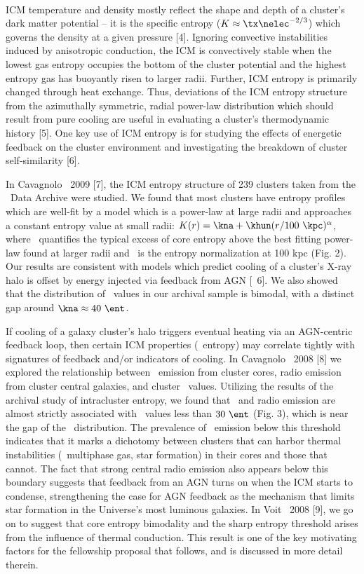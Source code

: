 \documentclass[letterpaper,12pt]{article}
\begin{document}
\\ \indent ICM
temperature and density mostly reflect the shape and depth of a
cluster's dark matter potential -- it is the specific entropy ($K
\approx \tx \nelec^{-2/3}$) which governs the density at a given
pressure [4]. Ignoring convective instabilities induced by anisotropic
conduction, the ICM is convectively stable when the lowest gas entropy
occupies the bottom of the cluster potential and the highest entropy
gas has buoyantly risen to larger radii. Further, ICM entropy is
primarily changed through heat exchange. Thus, deviations of the ICM
entropy structure from the azimuthally symmetric, radial power-law
distribution which should result from pure cooling are useful in
evaluating a cluster's thermodynamic history [5]. One key use of ICM
entropy is for studying the effects of energetic feedback on the
cluster environment and investigating the breakdown of cluster
self-similarity [6].

In Cavagnolo \etal\ 2009 [7], the ICM entropy structure of 239
clusters taken from the \chandra\ Data Archive were studied. We found
that most clusters have entropy profiles which are well-fit by a model
which is a power-law at large radii and approaches a constant entropy
value at small radii: $K(r) = \kna + \khun (r/100 ~\kpc)^{\alpha}$,
where \kna\ quantifies the typical excess of core entropy above the
best fitting power-law found at larger radii and \khun\ is the entropy
normalization at 100 kpc (Fig. 2). Our results are consistent with
models which predict cooling of a cluster's X-ray halo is offset by
energy injected via feedback from AGN [\eg\ 6]. We also showed that
the distribution of \kna\ values in our archival sample is bimodal,
with a distinct gap around $\kna \approx 40 ~\ent$.

If cooling of a galaxy cluster's halo triggers eventual heating via an
AGN-centric feedback loop, then certain ICM properties (\eg\ entropy)
may correlate tightly with signatures of feedback and/or indicators of
cooling. In Cavagnolo \etal\ 2008 [8] we explored the relationship
between \halpha\ emission from cluster cores, radio emission from
cluster central galaxies, and cluster \kna\ values. Utilizing the
results of the archival study of intracluster entropy, we found that
\halpha\ and radio emission are almost strictly associated with
\kna\ values less than $30 ~\ent$ (Fig. 3), which is near the gap of
the \kna\ distribution. The prevalence of \halpha\ emission below this
threshold indicates that it marks a dichotomy between clusters that
can harbor thermal instabilities (\eg\ multiphase gas, star formation)
in their cores and those that cannot. The fact that strong central
radio emission also appears below this boundary suggests that feedback
from an AGN turns on when the ICM starts to condense, strengthening
the case for AGN feedback as the mechanism that limits star formation
in the Universe's most luminous galaxies. In Voit \etal\ 2008 [9], we
go on to suggest that core entropy bimodality and the sharp entropy
threshold arises from the influence of thermal conduction. This result
is one of the key motivating factors for the fellowship proposal that
follows, and is discussed in more detail therein.\\
\end{document}
